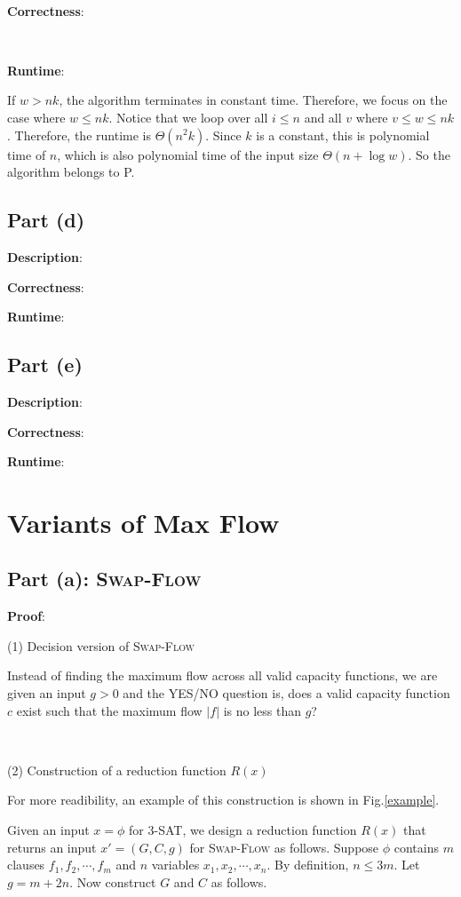 \documentclass{article}
\begin{document}
~

\noindent\textbf{Correctness}:

~

\noindent\textbf{Runtime}:

If $w>nk$, the algorithm terminates in constant time. Therefore, we focus on the case where $w\leqslant nk$. Notice that we loop over all $i\leqslant n$ and all $v$ where $v\leqslant w\leqslant nk$. Therefore, the runtime is $\Theta(n^2k)$. Since $k$ is a constant, this is polynomial time of $n$, which is also polynomial time of the input size $\Theta(n+\log w)$. So the algorithm belongs to P.

\subsection{Part (d)}
\noindent\textbf{Description}:

\noindent\textbf{Correctness}:

\noindent\textbf{Runtime}:

\subsection{Part (e)}
\noindent\textbf{Description}:

\noindent\textbf{Correctness}:

\noindent\textbf{Runtime}:

\section{Variants of Max Flow}
\subsection{Part (a): \textsc{Swap-Flow}}
\noindent\textbf{Proof}:


\noindent(1) Decision version of \textsc{Swap-Flow}

Instead of finding the maximum flow across all valid capacity functions, we are given an input $g>0$ and the YES/NO question is, does a valid capacity function $c$ exist such that the maximum flow $|f|$ is no less than $g$?

~

\noindent(2) Construction of a reduction function $R(x)$

For more readibility, an example of this construction is shown in Fig.\ref{example}.

Given an input $x=\phi$ for \textsc{3-SAT}, we design a reduction function $R(x)$ that returns an input $x'=(G,C,g)$ for \textsc{Swap-Flow} as follows. Suppose $\phi$ contains $m$ clauses $f_1,f_2,\cdots,f_m$ and $n$ variables $x_1,x_2,\cdots,x_n$. By definition, $n\leqslant 3m$. Let $g=m+2n$. Now construct $G$ and $C$ as follows.
\end{document}
